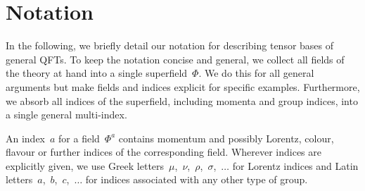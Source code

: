 \documentclass[10pt,prd,nofootinbib,superscriptaddress,twocolumn]{revtex4-2}
\begin{document}
\appendix


\section{Notation}
\label{app:notation}

In the following, we briefly detail our notation for describing tensor bases of general QFTs.
To keep the notation concise and general, we collect all fields of the theory at hand into a single superfield~$\Phi$. 
We do this for all general arguments but make fields and indices explicit for specific examples.
Furthermore, we absorb all indices of the superfield, including momenta and group indices, into a single general multi-index.

An index~$a$ for a field~$\Phi^a$ contains momentum and possibly Lorentz, colour, flavour or further indices of the corresponding field.
Wherever indices are explicitly given, we use Greek letters~$\mu$,~$\nu$,~$\rho$,~$\sigma$,~$\dotsc$ for Lorentz indices and Latin letters~$a$,~$b$,~$c$,~$\dotsc$ for indices associated with any other type of group. 
\end{document}
